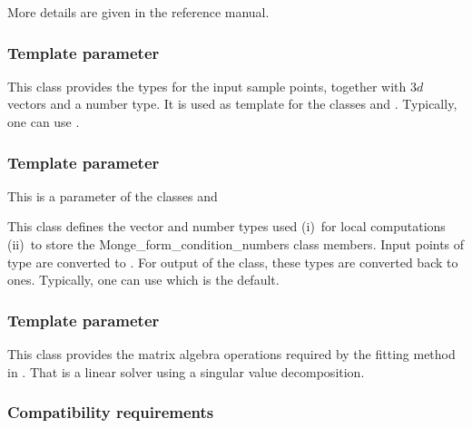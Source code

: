 More details are given in the reference manual.

\subsubsection{Template parameter }

This class provides the types for the input sample points, together
with $3d$ vectors and a number type. It is used as template for the
classes
 and 
. Typically, one can use .

\subsubsection{Template parameter }
This is a parameter of the classes 
and 

This class defines the vector and number types used (i)\ for local
computations (ii)\ to store the Monge\_form\_condition\_numbers class
members. Input points of type  are converted
to
. For output of the  class, these
types are converted back to  ones.  Typically, one can use
 which is the default.

\subsubsection{Template parameter }

This class provides the matrix algebra operations required by the
fitting method in 
. That is a linear solver using a singular value decomposition.

\subsubsection{Compatibility requirements}

